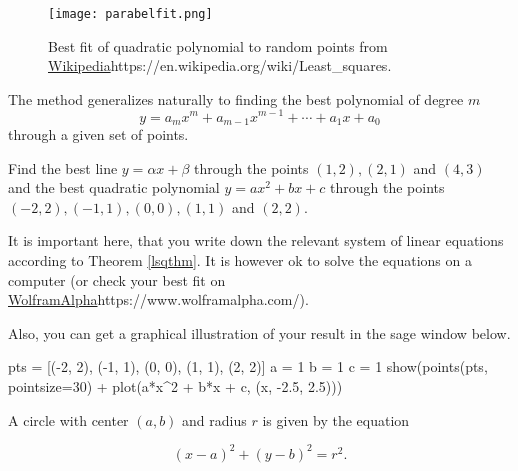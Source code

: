 \documentclass{article}
\begin{document}
\begin{example}
\begin{figure}
\texttt{[image: parabelfit.png]}
\caption{Best fit of quadratic polynomial to random points from  \url{Wikipedia}{https://en.wikipedia.org/wiki/Least_squares}.}
\end{figure}



The method generalizes naturally to finding the best polynomial of degree $m$
$$
y = a_m x^m + a_{m-1} x^{m-1} + \cdots + a_1 x + a_0 
$$
through a given set of points.
\end{example}

\beginshex
Find the best line $y = \alpha x + \beta$ through the points
$(1, 2), (2,1)$ and $(4,3)$ and the best quadratic polynomial
$ y = a x^2 + b x + c$ through the points
$(-2, 2), (-1, 1), (0,0), (1,1)$ and $(2,2)$.

It is important here, that you write down the relevant system
of linear equations according to Theorem \ref{lsqthm}.
It is however ok to solve the equations
on a computer (or check your best fit on \url{WolframAlpha}{https://www.wolframalpha.com/}).

Also, you can get a graphical illustration of your result in the sage window below.

\begin{sage}
pts = [(-2, 2), (-1, 1), (0, 0), (1, 1), (2, 2)]
a = 1
b = 1
c = 1
show(points(pts, pointsize=30) + plot(a*x^2 + b*x + c, (x, -2.5, 2.5)))
\end{sage}
\endshex


\beginshex
A circle with center $(a, b)$ and radius $r$ is given by the equation

\begin{equation}\label{eq:circle}
(x - a)^2 + (y - b)^2 = r^2.
\end{equation}
\end{document}
